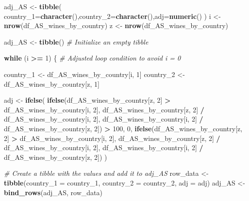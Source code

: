 \documentclass[
]{article}
\newenvironment{Shaded}{\begin{snugshade}}{\end{snugshade}}
\newcommand{\AttributeTok}[1]{\textcolor[rgb]{0.13,0.29,0.53}{#1}}
\newcommand{\CommentTok}[1]{\textcolor[rgb]{0.56,0.35,0.01}{\textit{#1}}}
\newcommand{\ControlFlowTok}[1]{\textcolor[rgb]{0.13,0.29,0.53}{\textbf{#1}}}
\newcommand{\DecValTok}[1]{\textcolor[rgb]{0.00,0.00,0.81}{#1}}
\newcommand{\FunctionTok}[1]{\textcolor[rgb]{0.13,0.29,0.53}{\textbf{#1}}}
\newcommand{\NormalTok}[1]{#1}
\newcommand{\OtherTok}[1]{\textcolor[rgb]{0.56,0.35,0.01}{#1}}
\newcommand{\SpecialCharTok}[1]{\textcolor[rgb]{0.81,0.36,0.00}{\textbf{#1}}}
\begin{document}
\begin{Shaded}
\begin{Highlighting}[]
\NormalTok{adj\_AS }\OtherTok{\textless{}{-}} \FunctionTok{tibble}\NormalTok{( }\AttributeTok{country\_1=}\FunctionTok{character}\NormalTok{(),}\AttributeTok{country\_2=}\FunctionTok{character}\NormalTok{(),}\AttributeTok{adj=}\FunctionTok{numeric}\NormalTok{()}
\NormalTok{)}
\NormalTok{i }\OtherTok{\textless{}{-}} \FunctionTok{nrow}\NormalTok{(df\_AS\_wines\_by\_country)}
\NormalTok{z }\OtherTok{\textless{}{-}} \FunctionTok{nrow}\NormalTok{(df\_AS\_wines\_by\_country)}

\NormalTok{adj\_AS }\OtherTok{\textless{}{-}} \FunctionTok{tibble}\NormalTok{()  }\CommentTok{\# Initialize an empty tibble}

\ControlFlowTok{while}\NormalTok{ (i }\SpecialCharTok{\textgreater{}=} \DecValTok{1}\NormalTok{) \{  }\CommentTok{\# Adjusted loop condition to avoid i = 0}

\NormalTok{  country\_1 }\OtherTok{\textless{}{-}}\NormalTok{ df\_AS\_wines\_by\_country[i, }\DecValTok{1}\NormalTok{]}
\NormalTok{  country\_2 }\OtherTok{\textless{}{-}}\NormalTok{ df\_AS\_wines\_by\_country[z, }\DecValTok{1}\NormalTok{]}

\NormalTok{  adj }\OtherTok{\textless{}{-}} \FunctionTok{ifelse}\NormalTok{(}
    \FunctionTok{ifelse}\NormalTok{(df\_AS\_wines\_by\_country[z, }\DecValTok{2}\NormalTok{] }\SpecialCharTok{\textgreater{}}\NormalTok{ df\_AS\_wines\_by\_country[i, }\DecValTok{2}\NormalTok{],}
\NormalTok{           df\_AS\_wines\_by\_country[z, }\DecValTok{2}\NormalTok{] }\SpecialCharTok{/}\NormalTok{ df\_AS\_wines\_by\_country[i, }\DecValTok{2}\NormalTok{],}
\NormalTok{           df\_AS\_wines\_by\_country[i, }\DecValTok{2}\NormalTok{] }\SpecialCharTok{/}\NormalTok{ df\_AS\_wines\_by\_country[z, }\DecValTok{2}\NormalTok{]) }\SpecialCharTok{\textgreater{}} \DecValTok{100}\NormalTok{,}
    \DecValTok{0}\NormalTok{,}
    \FunctionTok{ifelse}\NormalTok{(df\_AS\_wines\_by\_country[z, }\DecValTok{2}\NormalTok{] }\SpecialCharTok{\textgreater{}}\NormalTok{ df\_AS\_wines\_by\_country[i, }\DecValTok{2}\NormalTok{],}
\NormalTok{           df\_AS\_wines\_by\_country[z, }\DecValTok{2}\NormalTok{] }\SpecialCharTok{/}\NormalTok{ df\_AS\_wines\_by\_country[i, }\DecValTok{2}\NormalTok{],}
\NormalTok{           df\_AS\_wines\_by\_country[i, }\DecValTok{2}\NormalTok{] }\SpecialCharTok{/}\NormalTok{ df\_AS\_wines\_by\_country[z, }\DecValTok{2}\NormalTok{])}
\NormalTok{  )}

  \CommentTok{\# Create a tibble with the values and add it to adj\_AS}
\NormalTok{  row\_data }\OtherTok{\textless{}{-}} \FunctionTok{tibble}\NormalTok{(}\AttributeTok{country\_1 =}\NormalTok{ country\_1, }\AttributeTok{country\_2 =}\NormalTok{ country\_2, }\AttributeTok{adj =}\NormalTok{ adj)}
\NormalTok{  adj\_AS }\OtherTok{\textless{}{-}} \FunctionTok{bind\_rows}\NormalTok{(adj\_AS, row\_data)}


\end{Highlighting}
\end{Shaded}
\end{document}
